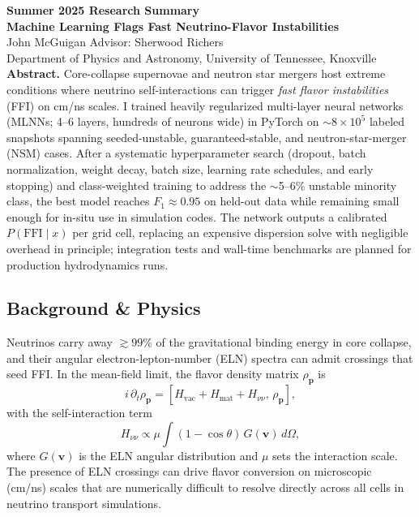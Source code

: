 \documentclass[10pt]{article}
\begin{document}
\begin{center}
{\Large \textbf{Summer 2025 Research Summary}}\\[2pt]
{\large \textbf{Machine Learning Flags Fast Neutrino-Flavor Instabilities}}\\[4pt]
John McGuigan \quad Advisor: Sherwood Richers\\
Department of Physics and Astronomy, University of Tennessee, Knoxville\\

\textbf{Abstract.}
Core-collapse supernovae and neutron star mergers host extreme conditions where neutrino self-interactions can trigger \emph{fast flavor instabilities} (FFI) on cm/ns scales.
I trained heavily regularized multi-layer neural networks (MLNNs; 4--6 layers, hundreds of neurons wide) in PyTorch on $\sim 8\times 10^5$ labeled snapshots spanning seeded-unstable, guaranteed-stable, and neutron-star-merger (NSM) cases.
After a systematic hyperparameter search (dropout, batch normalization, weight decay, batch size, learning rate schedules, and early stopping) and class-weighted training to address the $\sim$5--6\% unstable minority class, the best model reaches $F_1 \approx 0.95$ on held-out data while remaining small enough for in-situ use in simulation codes.
The network outputs a calibrated $P(\mathrm{FFI}\mid x)$ per grid cell, replacing an expensive dispersion solve with negligible overhead in principle; integration tests and wall-time benchmarks are planned for production hydrodynamics runs.

\subsection*{Background \& Physics}
Neutrinos carry away $\gtrsim 99\%$ of the gravitational binding energy in core collapse, and their angular electron-lepton-number (ELN) spectra can admit crossings that seed FFI.
In the mean-field limit, the flavor density matrix $\rho_{\mathbf{p}}$ is
\begin{equation*}
i\,\partial_t \rho_{\mathbf{p}} = \left[ H_{\mathrm{vac}} + H_{\mathrm{mat}} + H_{\nu\nu}, \, \rho_{\mathbf{p}} \right],
\end{equation*}
with the self-interaction term
\begin{equation*}
H_{\nu\nu} \propto \mu \!\int (1-\cos\theta)\, G(\mathbf{v})\, d\Omega,
\end{equation*}
where $G(\mathbf{v})$ is the ELN angular distribution and $\mu$ sets the interaction scale. The presence of ELN crossings can drive flavor conversion on microscopic (cm/ns) scales that are numerically difficult to resolve directly across all cells in neutrino transport simulations.


\end{center}
\end{document}
